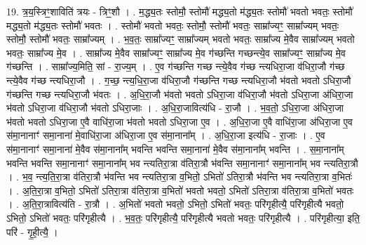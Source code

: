 \documentclass[17pt]{extarticle}
\begin{document}
19. त्र॒य॒स्त्रिꣳ॒॒शाविति॑ त्रयः - त्रिꣳ॒॒शौ । . म॒द्ध्य॒तः स्तोमौ॒ स्तोमौ॑ मद्ध्य॒तो म॑द्ध्य॒तः स्तोमौ॑ भवतो भवतः॒ स्तोमौ॑ मद्ध्य॒तो म॑द्ध्य॒तः स्तोमौ॑ भवतः । . स्तोमौ॑ भवतो भवतः॒ स्तोमौ॒ स्तोमौ॑ भवतः॒ साम्रा᳚ज्यꣳ॒॒ साम्रा᳚ज्यम् भवतः॒ स्तोमौ॒ स्तोमौ॑ भवतः॒ साम्रा᳚ज्यम् । . भ॒व॒तः॒ साम्रा᳚ज्यꣳ॒॒ साम्रा᳚ज्यम् भवतो भवतः॒ साम्रा᳚ज्य मे॒वैव साम्रा᳚ज्यम् भवतो भवतः॒ साम्रा᳚ज्य मे॒व । . साम्रा᳚ज्य मे॒वैव साम्रा᳚ज्यꣳ॒॒ साम्रा᳚ज्य मे॒व ग॑च्छन्ति गच्छन्त्ये॒व साम्रा᳚ज्यꣳ॒॒ साम्रा᳚ज्य मे॒व ग॑च्छन्ति । . साम्रा᳚ज्य॒मिति॒ सां - रा॒ज्य॒म् । . ए॒व ग॑च्छन्ति गच्छ न्त्ये॒वैव ग॑च्छ न्त्यधिरा॒जा व॑धिरा॒जौ ग॑च्छ न्त्ये॒वैव ग॑च्छ न्त्यधिरा॒जौ । . ग॒च्छ॒ न्त्य॒धि॒रा॒जा व॑धिरा॒जौ ग॑च्छन्ति गच्छ न्त्यधिरा॒जौ भ॑वतो भवतो ऽधिरा॒जौ ग॑च्छन्ति गच्छ
न्त्यधिरा॒जौ भ॑वतः । . अ॒धि॒रा॒जौ भ॑वतो भवतो ऽधिरा॒जा व॑धिरा॒जौ भ॑वतो ऽधिरा॒जा अ॑धिरा॒जा भ॑वतो ऽधिरा॒जा व॑धिरा॒जौ भ॑वतो ऽधिरा॒जाः । . अ॒धि॒रा॒जावित्य॑धि - रा॒जौ । . भ॒व॒तो॒ ऽधि॒रा॒जा अ॑धिरा॒जा भ॑वतो भवतो ऽधिरा॒जा ए॒वै वाधि॑रा॒जा भ॑वतो भवतो ऽधिरा॒जा ए॒व । . अ॒धि॒रा॒जा ए॒वै वाधि॑रा॒जा अ॑धिरा॒जा ए॒व स॑मा॒नानाꣳ॑ समा॒नाना॑ मे॒वाधि॑रा॒जा अ॑धिरा॒जा ए॒व स॑मा॒नाना᳚म् । . अ॒धि॒रा॒जा इत्य॑धि - रा॒जाः । . ए॒व स॑मा॒नानाꣳ॑ समा॒नाना॑ मे॒वैव स॑मा॒नाना᳚म् भवन्ति भवन्ति समा॒नाना॑ मे॒वैव स॑मा॒नाना᳚म् भवन्ति । . स॒मा॒नाना᳚म् भवन्ति भवन्ति समा॒नानाꣳ॑ समा॒नाना᳚म् भव न्त्यतिरा॒त्रा व॑तिरा॒त्रौ भ॑वन्ति समा॒नानाꣳ॑ समा॒नाना᳚म् भव न्त्यतिरा॒त्रौ । . भ॒व॒ न्त्य॒ति॒रा॒त्रा व॑तिरा॒त्रौ भ॑वन्ति भव न्त्यतिरा॒त्रा व॒भितो॒ ऽभितो॑ ऽतिरा॒त्रौ भ॑वन्ति भव न्त्यतिरा॒त्रा व॒भितः॑ । . अ॒ति॒रा॒त्रा व॒भितो॒ ऽभितो॑ ऽतिरा॒त्रा व॑तिरा॒त्रा व॒भितो॑ भवतो भवतो॒ ऽभितो॑ ऽतिरा॒त्रा व॑तिरा॒त्रा व॒भितो॑ भवतः । . अ॒ति॒रा॒त्रावित्य॑ति - रा॒त्रौ । . अ॒भितो॑ भवतो भवतो॒ ऽभितो॒ ऽभितो॑ भवतः॒ परि॑गृहीत्यै॒ परि॑गृहीत्यै भवतो॒ ऽभितो॒ ऽभितो॑ भवतः॒ परि॑गृहीत्यै । . भ॒व॒तः॒ परि॑गृहीत्यै॒ परि॑गृहीत्यै भवतो भवतः॒ परि॑गृहीत्यै । . परि॑गृहीत्या॒ इति॒ परि॑ - गृ॒ही॒त्यै॒ । \newline
\pagebreak
{}
\end{document}
